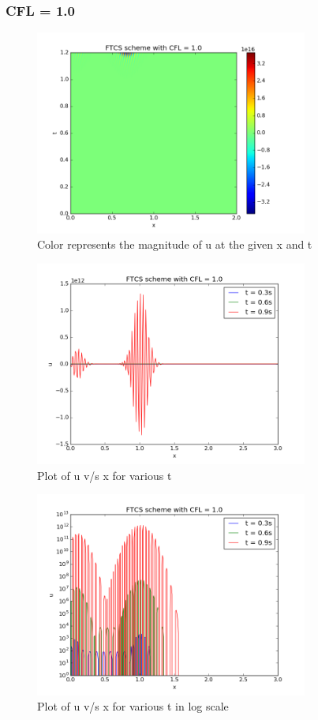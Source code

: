 \documentclass[11pt, a4paper]{article}
\begin{document}
\subsubsection{CFL = 1.0}
\begin{figure}[H]
 \centering
 \includegraphics[width = 0.8\textwidth]{FTCS3_1.png}
 \caption{Color represents the magnitude of u at the given x and t}
\end{figure}

\begin{figure}[H]
 \centering
 \includegraphics[width = 0.8\textwidth]{FTCS3_1_1.png}
 \caption{Plot of u v/s x for various t}
\end{figure}

\begin{figure}[H]
 \centering
 \includegraphics[width = 0.8\textwidth]{FTCS3_1_1_log.png}
 \caption{Plot of u v/s x for various t in log scale}
\end{figure}
\end{document}
